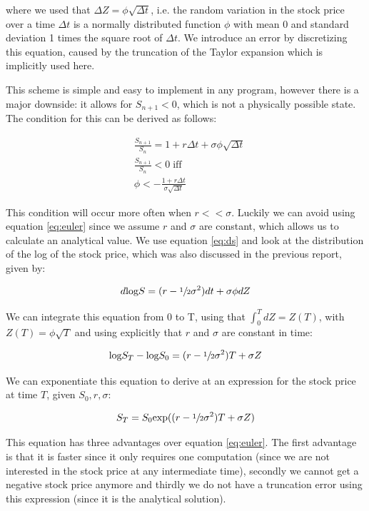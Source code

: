 \documentclass[11pt,a4paper]{article}
\begin{document}
where we used that $\Delta Z = \phi \sqrt{\Delta t}$, i.e. the random variation in the stock price over a time $\Delta t$ is a normally distributed function $\phi$ with mean 0 and standard deviation 1 times the square root of $\Delta t$. We introduce an error by discretizing this equation, caused by the truncation of the Taylor expansion which is implicitly used here. 

This scheme is simple and easy to implement in any program, however there is a major downside: it allows for $S_{n+1} < 0$, which is not a physically possible state. The condition for this can be derived as follows:

\begin{align}
  &\frac{S_{n+1}}{S_n} = 1 + r\Delta t + \sigma \phi \sqrt{\Delta t} \nonumber \\
  &\frac{S_{n+1}}{S_n} < 0 \; \text{iff} \nonumber \\
  &\phi < - \frac{1 + r\Delta t}{\sigma \sqrt{\Delta t}}
\end{align}

This condition will occur more often when $r << \sigma$. Luckily we can avoid using equation \ref{eq:euler} since we assume $r$ and $\sigma$ are constant, which allows us to calculate an analytical value. We use equation \ref{eq:ds} and look at the distribution of the log of the stock price, which was also discussed in the previous report, given by:

\begin{align}
  d\text{log}S = (r-\sfrac{1}{2}\sigma^2)dt + \sigma \phi dZ
\end{align}

We can integrate this equation from 0 to T, using that $\int_0^T dZ = Z(T)$, with $Z(T) = \phi \sqrt{T}$ and using explicitly that $r$ and $\sigma$ are constant in time:

\begin{equation}
  \text{log}S_T - \text{log}S_0 = (r - \sfrac{1}{2}\sigma^2)T + \sigma Z
\end{equation}

We can exponentiate this equation to derive at an expression for the stock price at time $T$, given $S_0, r, \sigma$:

\begin{equation}
  \label{eq:st}
  S_T = S_0\text{exp}((r-\sfrac{1}{2}\sigma^2)T + \sigma Z)
\end{equation}

This equation has three advantages over equation \ref{eq:euler}. The first advantage is that it is faster since it only requires one computation (since we are not interested in the stock price at any intermediate time), secondly we cannot get a negative stock price anymore and thirdly we do not have a truncation error using this expression (since it is the analytical solution).
\end{document}
